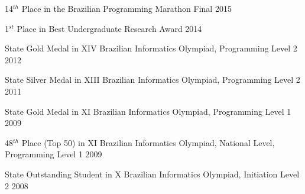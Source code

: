 
14$^{th}$ Place in the Brazilian Programming Marathon Final \hfill 2015

1$^{st}$ Place in Best Undergraduate Research Award \hfill 2014

State Gold Medal in XIV Brazilian Informatics Olympiad, Programming Level 2 \hfill 2012

State Silver Medal in XIII Brazilian Informatics Olympiad, Programming Level 2 \hfill 2011

State Gold Medal in XI Brazilian Informatics Olympiad, Programming Level 1 \hfill 2009

48$^{th}$ Place (Top 50) in XI Brazilian Informatics Olympiad, National Level, Programming Level 1 \hfill 2009

State Outstanding Student in X Brazilian Informatics Olympiad, Initiation Level 2 \hfill 2008

